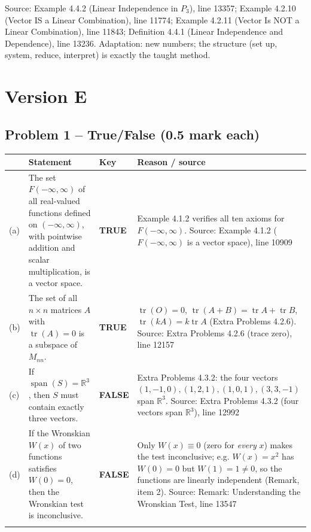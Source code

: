 \documentclass[11pt,a4paper]{article}
\newcommand{\Src}[1]{{\footnotesize\color{black!65}Source: #1}}
\begin{document}
\Src{Example 4.4.2 (Linear Independence in $P_3$), line 13357; Example 4.2.10 (Vector IS a Linear Combination), line 11774; Example 4.2.11 (Vector Is NOT a Linear Combination), line 11843; Definition 4.4.1 (Linear Independence and Dependence), line 13236. Adaptation: new numbers; the structure (set up, system, reduce, interpret) is exactly the taught method.}\par
\clearpage\section*{Version E}
\subsection*{Problem 1 -- True/False (0.5 mark each)}
\begin{tabularx}{\linewidth}{@{}l X l X@{}}\toprule & Statement & Key & Reason / source\\\midrule
(a) & The set $F(-\infty,\infty)$ of all real-valued functions defined on $(-\infty,\infty)$, with pointwise addition and scalar multiplication, is a vector space. & \textbf{TRUE} & Example 4.1.2 verifies all ten axioms for $F(-\infty,\infty)$. \Src{Example 4.1.2 ($F(-\infty,\infty)$ is a vector space), line 10909}\\\addlinespace
(b) & The set of all $n\times n$ matrices $A$ with $\operatorname{tr}(A)=0$ is a subspace of $M_{nn}$. & \textbf{TRUE} & $\operatorname{tr}(O)=0$, $\operatorname{tr}(A+B)=\operatorname{tr}A+\operatorname{tr}B$, $\operatorname{tr}(kA)=k\operatorname{tr}A$ (Extra Problems 4.2.6). \Src{Extra Problems 4.2.6 (trace zero), line 12157}\\\addlinespace
(c) & If $\operatorname{span}(S)=\mathbb{R}^3$, then $S$ must contain exactly three vectors. & \textbf{FALSE} & Extra Problems 4.3.2: the four vectors $(1,-1,0),(1,2,1),(1,0,1),(3,3,-1)$ span $\mathbb{R}^3$. \Src{Extra Problems 4.3.2 (four vectors span $\mathbb{R}^3$), line 12992}\\\addlinespace
(d) & If the Wronskian $W(x)$ of two functions satisfies $W(0)=0$, then the Wronskian test is inconclusive. & \textbf{FALSE} & Only $W(x)\equiv0$ (zero for \emph{every} $x$) makes the test inconclusive; e.g. $W(x)=x^2$ has $W(0)=0$ but $W(1)=1\neq0$, so the functions are linearly independent (Remark, item 2). \Src{Remark: Understanding the Wronskian Test, line 13547}\\\addlinespace
\bottomrule\end{tabularx}
\end{document}

